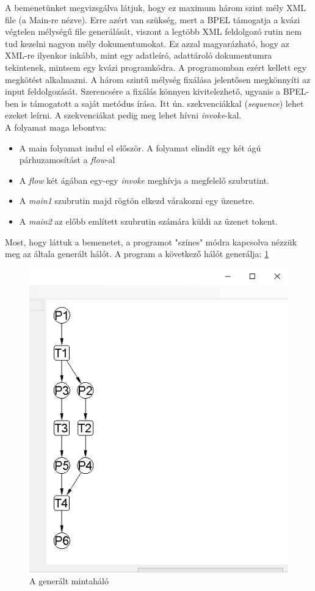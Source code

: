 A bemenetünket megvizsgálva látjuk, hogy ez maximum három szint mély XML file (a Main-re nézve). Erre azért van szükség, mert a BPEL támogatja a kvázi végtelen mélységű file generálását, viszont a legtöbb XML feldolgozó rutin nem tud kezelni nagyon mély dokumentumokat. Ez azzal magyarázható, hogy az XML-re ilyenkor inkább, mint egy adatleíró, adattároló dokumentumra tekintenek, mintsem egy kvázi programkódra. A programomban ezért kellett egy megkötést alkalmazni. A három szintű mélység fixálása jelentősen megkönnyíti az input feldolgozását. Szerencsére a fixálás könnyen kivitelezhető, ugyanis a BPEL-ben is támogatott a saját metódus írása. Itt ún. szekvenciákkal (\emph{sequence}) lehet ezeket leírni. A szekvenciákat pedig meg lehet hívni \emph{invoke}-kal.\\
A folyamat maga lebontva:
\begin{itemize}
\item A main folyamat indul el először. A folyamat elindít egy két ágú párhuzamosítást a \emph{flow}-al
\item A \emph{flow} két ágában egy-egy \emph{invoke} meghívja a megfelelő szubrutint.
\item A \emph{main1} szubrutin majd rögtön elkezd várakozni egy üzenetre.
\item A \emph{main2} az előbb említett szubrutin számára küldi az üzenet tokent. 
\end{itemize}

Most, hogy láttuk a bemenetet, a programot "színes" módra kapcsolva nézzük meg az általa generált hálót.
A program a következő hálót generálja: \ref{fig:demo} 

\begin{figure}[h!]
\centering
\includegraphics[scale=0.6]{images/demo2.png}
\caption{A generált mintaháló}
\label{fig:demo}
\end{figure}

